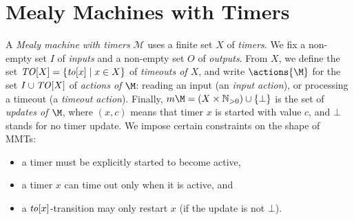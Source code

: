 %


\section{Mealy Machines with Timers}

A \emph{Mealy machine with timers} \(\mathcal{M}\) uses a finite set $X$ of
\emph{timers}.  We fix a non-empty set \(I\) of \emph{inputs} and a non-empty
set \(O\) of \emph{outputs}.
From  
\(X\),  
we define the set
\(\mathit{TO}[X] = \{\mathit{to}[x] \mid x \in X\}\) of \emph{timeouts of \(X\)}, and
write \(\actions{\M}\) for the set \(I \cup \mathit{TO}[X]\) of \emph{actions of
\(\M\)}: %
reading an input (an \emph{input action}),
or processing a timeout (a \emph{timeout action}).
Finally, \(\updates{\M} = (X \times \natplus) \cup \{\bot\}\) is the set of
\emph{updates of \(\M\)}, where $(x, c)$ means that timer $x$ is started with
value $c$, and $\bot$ stands for no timer update.
We impose certain
constraints on the shape of 
MMTs:
\begin{itemize}
  \item a timer must be explicitly started to become active,
  \item a timer \(x\) can time out only when it is active, and
  \item a \(\mathit{to}[x]\)-transition may only restart \(x\) (if the update is
not \(\bot\)).
\end{itemize}

